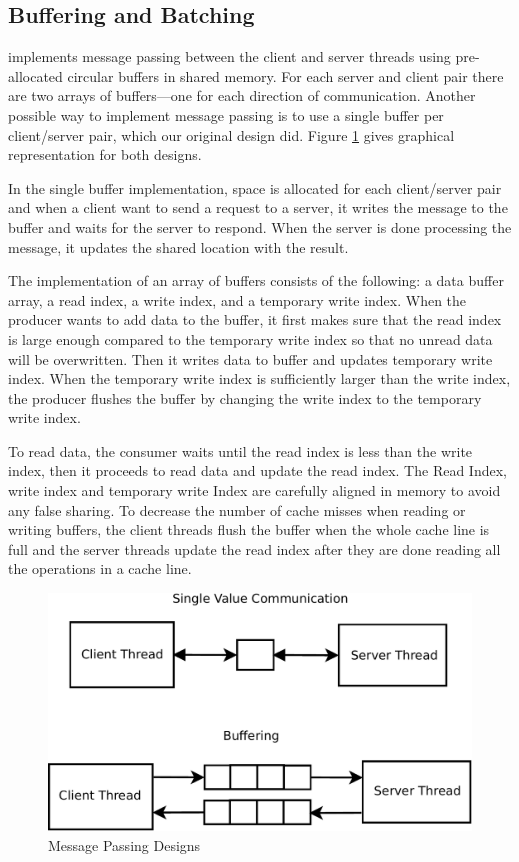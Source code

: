 \subsection{Buffering and Batching}
\label{sec:msgpassing}

\cphash{} implements message passing between the client and server threads using
pre-allocated circular buffers in shared memory.  For each server and client
pair there are two arrays of buffers---one for each direction of
communication. Another possible way to implement message passing is to use a
single buffer per client/server pair, which our original design did.  Figure
\ref{fig:mpdesign} gives graphical representation for both designs.

In the single buffer implementation, space is allocated for each client/server
pair and when a client want to send a request to a server, it writes the message
to the buffer and waits for the server to respond. When the server is done
processing the message, it updates the shared location with the result.

The implementation of an array of buffers consists of the following: a data
buffer array, a read index, a write index, and a temporary write index. When the
producer wants to add data to the buffer, it first makes sure that the read
index is large enough compared to the temporary write index so that no unread
data will be overwritten. Then it writes data to buffer and updates temporary
write index. When the temporary write index is sufficiently larger than the
write index, the producer flushes the buffer by changing the write index to the
temporary write index.

To read data, the consumer waits until the read index is less than the write
index, then it proceeds to read data and update the read index. The Read Index,
write index and temporary write Index are carefully aligned in memory to avoid
any false sharing.  To decrease the number of cache misses when reading or
writing buffers, the client threads flush the buffer when the whole cache line
is full and the server threads update the read index after they are done reading
all the operations in a cache line.

\begin{figure}[t]
  \centering
  \includegraphics[width=\linewidth]{figs/mpdesign.pdf}
  \caption{Message Passing Designs}
  \label{fig:mpdesign}
\end{figure}

